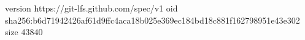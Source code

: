 version https://git-lfs.github.com/spec/v1
oid sha256:b6d71942426af61d9ffc4aca18b025e369ec184bd18c881f162798951e43e302
size 43840
